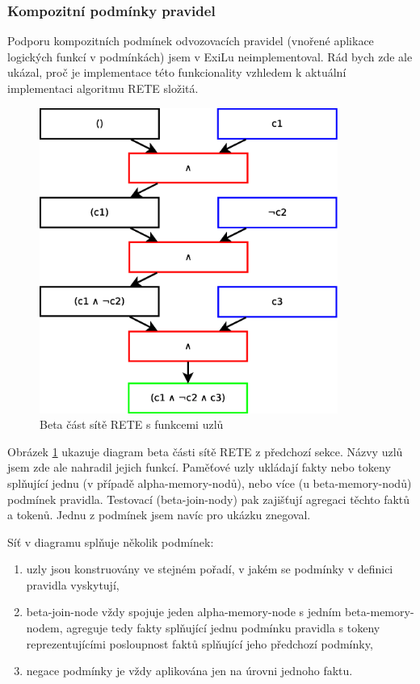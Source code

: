 \subsubsection{Kompozitní podmínky pravidel}

Podporu kompozitních podmínek odvozovacích pravidel (vnořené aplikace logických
funkcí v podmínkách) jsem v ExiLu neimplementoval. Rád bych zde ale ukázal, proč
je implementace této funkcionality vzhledem k aktuální implementaci algoritmu
RETE složitá.

\begin{figure}[h]
\centering
\includegraphics[height=10cm]{rete-beta-conds.eps}
\caption{Beta část sítě RETE s funkcemi uzlů}
\label{rete-beta-conds}
\end{figure}

Obrázek \ref{rete-beta-conds} ukazuje diagram beta části sítě RETE z předchozí
sekce. Názvy uzlů jsem zde ale nahradil jejich funkcí. Paměťové uzly ukládají
fakty nebo tokeny splňující jednu (v případě alpha-memory-nodů), nebo více (u
beta-memory-nodů) podmínek pravidla. Testovací (beta-join-nody) pak zajišťují
agregaci těchto faktů a tokenů. Jednu z podmínek jsem navíc pro ukázku znegoval.

Síť v diagramu splňuje několik podmínek:
\begin{enumerate}
  \item uzly jsou konstruovány ve stejném pořadí, v jakém se podmínky v definici
    pravidla vyskytují,
  \item beta-join-node vždy spojuje jeden alpha-memory-node s jedním
    beta-memory-nodem, agreguje tedy fakty splňující jednu podmínku pravidla s
    tokeny reprezentujícími posloupnost faktů splňující jeho předchozí podmínky,
  \item negace podmínky je vždy aplikována jen na úrovni jednoho faktu.
\end{enumerate}

